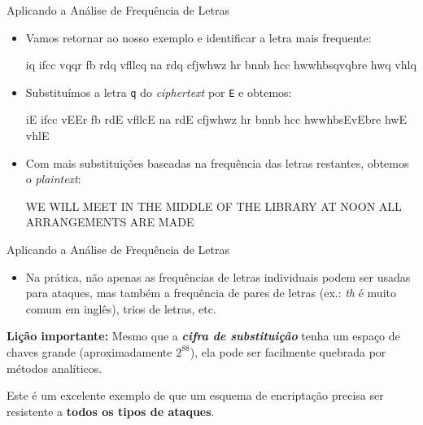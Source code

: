 \documentclass{beamer}
\begin{document}
\begin{frame}{Aplicando a Análise de Frequência de Letras}
\begin{itemize}
    \item Vamos retornar ao nosso exemplo e identificar a letra mais frequente:\\
    \begin{center}
        {\ttfamily
        i{\color{orange}q} ifcc v{\color{orange}q}{\color{orange}q}r fb rd{\color{orange}q} vfllc{\color{orange}q} na rd{\color{orange}q} cfjwhwz hr bnnb hcc hwwhbs{\color{orange}q}v{\color{orange}q}bre hw{\color{orange}q} vhl{\color{orange}q}
        }    
    \end{center}
    \vspace{1em}
    \item Substituímos a letra \texttt{q} do \textit{ciphertext} por \texttt{E} e obtemos:\\
    \begin{center}
        {\ttfamily
        i{\color{orange}E} ifcc v{\color{orange}E}{\color{orange}E}r fb rd{\color{orange}E} vfllc{\color{orange}E} na rd{\color{orange}E} cfjwhwz hr bnnb hcc hwwhbs{\color{orange}E}v{\color{orange}E}bre hw{\color{orange}E} vhl{\color{orange}E}
        }    
    \end{center}
    \vspace{1em}
    \item Com mais substituições baseadas na frequência das letras restantes, obtemos o \textit{plaintext}:
    \begin{center}
        {\color{orange}\ttfamily
        WE WILL MEET IN THE MIDDLE OF THE LIBRARY AT NOON 
        ALL ARRANGEMENTS ARE MADE}    
    \end{center}
    
\end{itemize}
\end{frame}


\begin{frame}{Aplicando a Análise de Frequência de Letras}
\begin{itemize}
    \item Na prática, não apenas as frequências de letras individuais podem ser usadas para ataques, mas também a frequência de pares de letras (ex.: \textit{th} é muito comum em inglês), trios de letras, etc.

\end{itemize}

\vspace{1em}
\textbf{Lição importante:} Mesmo que a \textit{\textbf{cifra de substituição }} tenha um espaço de chaves grande (aproximadamente $2^{88}$), ela pode ser facilmente quebrada por métodos analíticos. 

Este é um excelente exemplo de que um esquema de encriptação precisa ser resistente a \textbf{todos os tipos de ataques}.
\end{frame}
\end{document}
